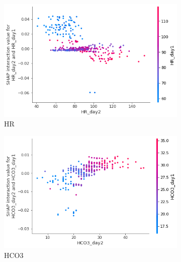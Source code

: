 \documentclass[12pt]{article}
\begin{document}
\begin{figure}[H]
     \centering
     \begin{subfigure}[b]{0.47\textwidth}
         \centering
         \includegraphics[width=\linewidth]{TreeExplainer Final2/TreeExplainer Final2 Interaction HR_day2 day 2.png}
         \caption{HR}
     \end{subfigure}
     \hfill
     \begin{subfigure}[b]{0.47\textwidth}
         \centering
         \includegraphics[width=\linewidth]{TreeExplainer Final2/TreeExplainer Final2 Interaction HCO3_day2 day 2.png}
         \caption{HCO3}
     \end{subfigure}
     \hfill
     \begin{subfigure}[b]{0.47\textwidth}
         \centering

\end{subfigure}
\end{figure}
\end{document}
